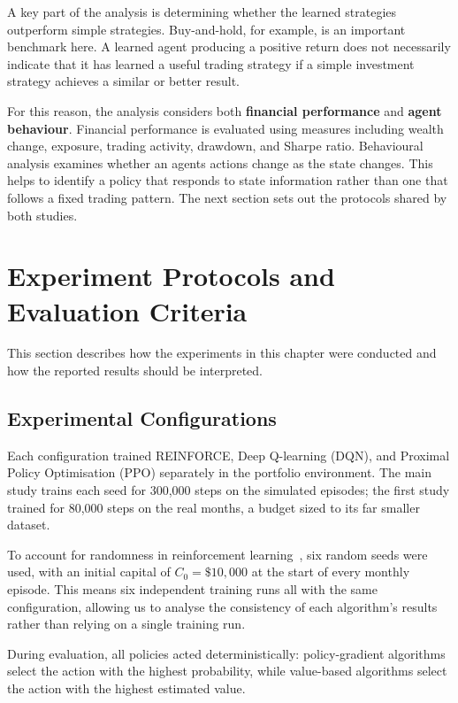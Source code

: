 A key part of the analysis is determining whether the learned strategies
outperform simple strategies. Buy-and-hold, for example, is an important
benchmark here. A learned agent producing a positive return does not
necessarily indicate that it has learned a useful trading strategy if a
simple investment strategy achieves a similar or better result.

For this reason, the analysis considers both \textbf{financial
performance} and \textbf{agent behaviour}. Financial performance is
evaluated using measures including wealth change, exposure, trading
activity, drawdown, and Sharpe ratio. Behavioural analysis examines
whether an agent\textquotesingle s actions change as the state changes.
This helps to identify a policy that responds to state information
rather than one that follows a fixed trading pattern. The next section
sets out the protocols shared by both studies.

\section{Experiment Protocols and Evaluation Criteria}

This section describes how the experiments in this chapter were
conducted and how the reported results should be interpreted.

\subsection{Experimental Configurations}

Each configuration trained REINFORCE, Deep Q-learning (DQN), and
Proximal Policy Optimisation (PPO) separately in the portfolio
environment. The main study trains each seed for 300,000 steps on the
simulated episodes; the first study trained for 80,000 steps on the real
months, a budget sized to its far smaller dataset.

To account for randomness in reinforcement learning~\cite{henderson2018}, six random seeds
were used, with an initial capital of \(C_{0} = \$ 10,000\) at the start
of every monthly episode. This means six independent training runs all
with the same configuration, allowing us to analyse the consistency of
each algorithm's results rather than relying on a single training run.

During evaluation, all policies acted deterministically: policy-gradient
algorithms select the action with the highest probability, while
value-based algorithms select the action with the highest estimated
value.

